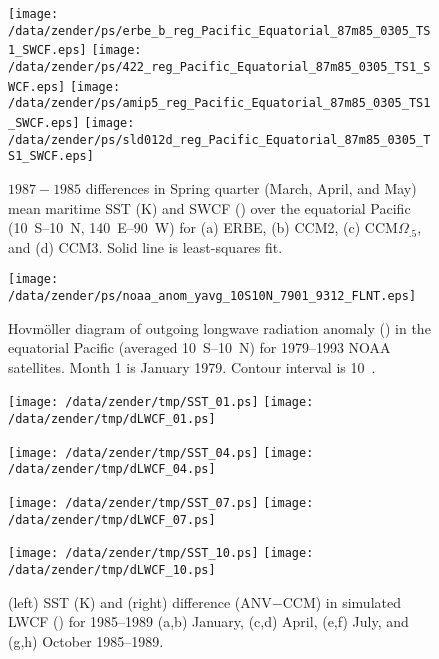 \documentclass[twocolumn,final,11pt]{article}
\begin{document}
\begin{sidewaysfigure}
\begin{center}
\texttt{[image: /data/zender/ps/erbe\_b\_reg\_Pacific\_Equatorial\_87m85\_0305\_TS1\_SWCF.eps]}%
\texttt{[image: /data/zender/ps/422\_reg\_Pacific\_Equatorial\_87m85\_0305\_TS1\_SWCF.eps]}%
\texttt{[image: /data/zender/ps/amip5\_reg\_Pacific\_Equatorial\_87m85\_0305\_TS1\_SWCF.eps]}%
\texttt{[image: /data/zender/ps/sld012d\_reg\_Pacific\_Equatorial\_87m85\_0305\_TS1\_SWCF.eps]}%
\end{center}
\caption[$1987-1985$ differences in Spring quarter (March, April, and May)
mean maritime SST and SWCF over the equatorial Pacific for ERBE, CCM2, CCM$\Omega_{.5}$,
and CCM3]{ 
$1987-1985$ differences in Spring quarter (March, April, and May)
mean maritime SST (\degreee K) and SWCF (\wxmS) over the equatorial
Pacific  (10~\degreee S--10~\degreee N, 140~\degreee E--90~\degreee W)
for (a) ERBE, (b) CCM2, (c) CCM$\Omega_{.5}$, and (d) CCM3.
Solid line is least-squares fit.
\label{fig:reg_Pacific_Equatorial_87m85_0305_TS1_SWCF}}   
\end{sidewaysfigure}
\clearpage

\begin{figure*}
\begin{center}
\texttt{[image: /data/zender/ps/noaa\_anom\_yavg\_10S10N\_7901\_9312\_FLNT.eps]}
\end{center}
\caption[Hovm\"oller diagram of outgoing longwave radiation
anomaly in the equatorial Pacific for 1979--1993 NOAA satellites]{ 
Hovm\"oller diagram of outgoing longwave radiation anomaly (\wxmS) in
the equatorial Pacific (averaged 10~\degreee S--10~\degreee N) for 
1979--1993 NOAA satellites.
Month 1 is January 1979.  
Contour interval is 10~\wxmS. 
\label{fig:anom_yavg_10S10N_7901_9312_FLNT}}
\end{figure*}
\clearpage

\begin{figure*}
\begin{center}
\texttt{[image: /data/zender/tmp/SST\_01.ps]}%
\texttt{[image: /data/zender/tmp/dLWCF\_01.ps]}%

\texttt{[image: /data/zender/tmp/SST\_04.ps]}%
\texttt{[image: /data/zender/tmp/dLWCF\_04.ps]}%

\texttt{[image: /data/zender/tmp/SST\_07.ps]}%
\texttt{[image: /data/zender/tmp/dLWCF\_07.ps]}%

\texttt{[image: /data/zender/tmp/SST\_10.ps]}%
\texttt{[image: /data/zender/tmp/dLWCF\_10.ps]}%
\end{center}
\caption[SST and difference (ANV$-$CCM) in simulated LWCF for
1985--1989 January, April, July, and October]{
(left) SST (\degreee K) and (right) difference (ANV$-$CCM) in
simulated LWCF (\wxmS) for 1985--1989 (a,b) January, (c,d) April,
(e,f) July, and (g,h) October 1985--1989.
\label{fig:SST_dLWCF}}   
\end{figure*}
\end{document}
